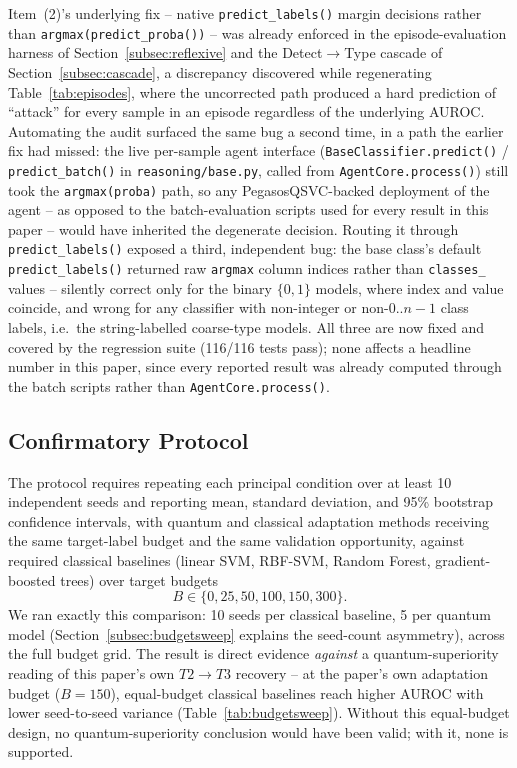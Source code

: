 \documentclass[conference]{IEEEtran}
\begin{document}
Item~(2)'s underlying fix -- native \texttt{predict\_labels()} margin
decisions rather than \texttt{argmax(predict\_proba())} -- was already
enforced in the episode-evaluation harness of
Section~\ref{subsec:reflexive} and the Detect$\to$Type cascade of
Section~\ref{subsec:cascade}, a discrepancy discovered while regenerating
Table~\ref{tab:episodes}, where the uncorrected path produced a hard
prediction of ``attack'' for every sample in an episode regardless of the
underlying AUROC. Automating the audit surfaced the same bug a second
time, in a path the earlier fix had missed: the live per-sample agent
interface (\texttt{BaseClassifier.predict()} /
\texttt{predict\_batch()} in \texttt{reasoning/base.py}, called from
\texttt{AgentCore.process()}) still took the \texttt{argmax(proba)}
path, so any PegasosQSVC-backed deployment of the agent -- as opposed to
the batch-evaluation scripts used for every result in this paper -- would
have inherited the degenerate decision. Routing it through
\texttt{predict\_labels()} exposed a third, independent bug: the base
class's default \texttt{predict\_labels()} returned raw
\texttt{argmax} column indices rather than \texttt{classes\_} values --
silently correct only for the binary $\{0,1\}$ models, where index and
value coincide, and wrong for any classifier with non-integer or
non-$0..n{-}1$ class labels, i.e.\ the string-labelled coarse-type
models. All three are now fixed and covered by the regression suite
(116/116 tests pass); none affects a headline number in this paper, since
every reported result was already computed through the batch scripts
rather than \texttt{AgentCore.process()}.

\subsection{Confirmatory Protocol}
\label{subsec:confirmatory}

The protocol requires repeating each principal condition over at least 10
independent seeds and reporting mean, standard deviation, and 95\%
bootstrap confidence intervals, with quantum and classical adaptation
methods receiving the same target-label budget and the same validation
opportunity, against required classical baselines (linear SVM, RBF-SVM,
Random Forest, gradient-boosted trees) over target budgets
\begin{equation}
B \in \{0, 25, 50, 100, 150, 300\}.
\label{eq:budgets}
\end{equation}
We ran exactly this comparison: 10 seeds per classical baseline, 5 per
quantum model (Section~\ref{subsec:budgetsweep} explains the seed-count
asymmetry), across the full budget grid. The result is direct evidence
\emph{against} a quantum-superiority reading of this paper's own
$T2\to T3$ recovery -- at the paper's own adaptation budget ($B{=}150$),
equal-budget classical baselines reach higher AUROC with lower
seed-to-seed variance (Table~\ref{tab:budgetsweep}). Without this
equal-budget design, no quantum-superiority conclusion would have been
valid; with it, none is supported.
\end{document}
